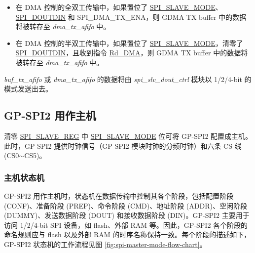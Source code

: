 \documentclass[main\_\_CN.tex]{subfiles}
\begin{document}
\begin{itemize}
\begin{itemize}
        \item 在 DMA 控制的全双工传输中，如果置位了 \hyperref[fielddesc:SPISLAVEMODE]{SPI\_SLAVE\_MODE}、\hyperref[fielddesc:SPIDOUTDIN]{SPI\_DOUTDIN} 和 SPI\_DMA\_TX\_ENA，则 GDMA TX buffer 中的数据将被转存至 \emph{dma\_tx\_afifo} 中。

        \item 在 DMA 控制的半双工传输中，如果置位了 \hyperref[fielddesc:SPISLAVEMODE]{SPI\_SLAVE\_MODE}，清零了 \hyperref[fielddesc:SPIDOUTDIN]{SPI\_DOUTDIN}，且收到指令 \hyperref[cmd:rddma]{Rd\_DMA}，则 GDMA TX buffer 中的数据将被转存至 \emph{dma\_tx\_afifo} 中。

    \end{itemize}

\emph{buf\_tx\_afifo} 或 \emph{dma\_tx\_afifo} 的数据将由 \emph{spi\_slv\_dout\_ctrl} 模块以 1/2/4-bit 的模式发送出去。
\end{itemize}

\subsection{GP-SPI2 用作主机}\label{sec:gp-spi2-master-mode}
清零 \hyperref[regdesc:SPISLAVEREG]{SPI\_SLAVE\_REG} 中 \hyperref[fielddesc:SPISLAVEMODE]{SPI\_SLAVE\_MODE} 位可将 GP-SPI2 配置成主机。此时，GP-SPI2 提供时钟信号（GP-SPI2 模块时钟的分频时钟）和六条 CS 线 (CS0$\sim$CS5)。



\subsubsection{主机状态机}
\label{sec:gp-spi2-state-machine}

GP-SPI2 用作主机时，状态机在数据传输中控制其各个阶段，包括配置阶段 (CONF)、准备阶段 (PREP)、命令阶段 (CMD)、地址阶段 (ADDR)、空闲阶段 (DUMMY)、发送数据阶段 (DOUT) 和接收数据阶段 (DIN)。GP-SPI2 主要用于访问 1/2/4-bit SPI 设备，如 flash、外部 RAM 等。因此，GP-SPI2 各个阶段的命名规则应与 flash 以及外部 RAM 的时序名称保持一致。每个阶段的描述如下，GP-SPI2 状态机的工作流程见图  \ref{fig:spi-master-mode-flow-chart}。
\end{document}
